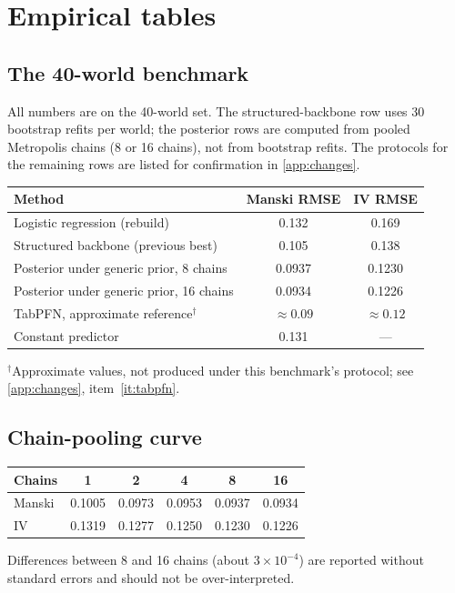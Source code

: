 \documentclass[11pt]{article}
\theoremstyle{definition}
\theoremstyle{remark}
\begin{document}
\appendix

\section{Empirical tables}\label{app:empirical}

\subsection{The 40-world benchmark}
All numbers are on the 40-world set. The structured-backbone row uses 30 bootstrap refits per
world; the posterior rows are computed from pooled Metropolis chains (8 or 16 chains), not from
bootstrap refits. The protocols for the remaining rows are listed for confirmation in
\cref{app:changes}.

\begin{center}
\begin{tabular}{@{}lcc@{}}
\toprule
Method & Manski RMSE & IV RMSE\\
\midrule
Logistic regression (rebuild) & 0.132 & 0.169\\
Structured backbone (previous best) & 0.105 & 0.138\\
Posterior under generic prior, 8 chains & 0.0937 & 0.1230\\
Posterior under generic prior, 16 chains & 0.0934 & 0.1226\\
TabPFN, approximate reference$^{\dagger}$ & $\approx0.09$ & $\approx0.12$\\
Constant predictor & 0.131 & ---\\
\bottomrule
\end{tabular}
\end{center}
{\small $^\dagger$Approximate values, not produced under this benchmark's protocol; see
\cref{app:changes}, item~\ref{it:tabpfn}.}

\subsection{Chain-pooling curve}
\begin{center}
\begin{tabular}{@{}lccccc@{}}
\toprule
Chains & 1 & 2 & 4 & 8 & 16\\
\midrule
Manski & 0.1005 & 0.0973 & 0.0953 & 0.0937 & 0.0934\\
IV & 0.1319 & 0.1277 & 0.1250 & 0.1230 & 0.1226\\
\bottomrule
\end{tabular}
\end{center}
Differences between 8 and 16 chains (about $3\times10^{-4}$) are reported without standard errors and
should not be over-interpreted.
\end{document}
